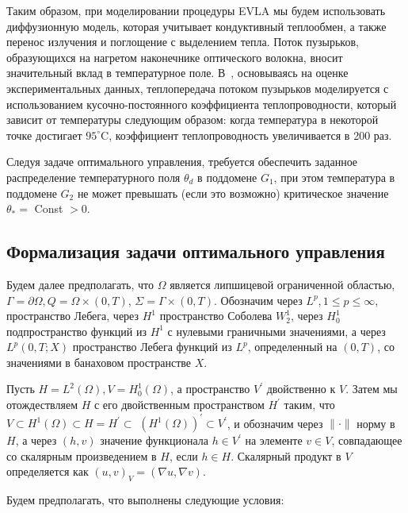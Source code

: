 Таким образом, при моделировании процедуры EVLA мы будем использовать
диффузионную модель, которая учитывает кондуктивный теплообмен,
а также перенос излучения и поглощение с выделением тепла.
Поток пузырьков, образующихся на нагретом наконечнике оптического волокна,
вносит значительный вклад в температурное поле.
В~\cite{Opticalthermal_vanRuijven2014, Some_Poluektova2014, Endovenous_Malskat2014},
основываясь на оценке экспериментальных данных,
теплопередача потоком пузырьков моделируется с использованием кусочно-постоянного
коэффициента теплопроводности, который зависит от температуры следующим образом:
когда температура в некоторой точке достигает $95 ^ {\circ} \mathrm{C}$,
коэффициент теплопроводность увеличивается в 200 раз.

Следуя задаче оптимального управления, требуется обеспечить заданное распределение
температурного поля $\theta_{d}$ в поддомене $G_{1}$, при этом температура в поддомене
$G_{2}$ не может превышать (если это возможно) критическое значение $\theta_{*}=$ Const $>0$.

\subsection{Формализация задачи оптимального управления}
\label{subsec:ch3:sec2:subsec2}

Будем далее предполагать, что $\Omega$ является липшицевой ограниченной областью,
$\Gamma=\partial \Omega, Q=\Omega \times(0, T)$, $\Sigma=\Gamma \times(0, T)$.
Обозначим через $L^{p}, 1 \leq p \leq \infty$, пространство Лебега,
через $H^{1}$ пространство Соболева $W_{2}^{1}$,
через $H_{ 0}^{1}$ подпространство функций из $H^{1}$ с нулевыми граничными значениями,
а через $L^{p}(0, T ; X)$ пространство Лебега функций из $L^{p}$,
определенный на $(0, T)$, со значениями в банаховом пространстве $X$.

Пусть $H=L^{2}(\Omega), V=H_{0}^{1}(\Omega)$, а пространство $V^{\prime}$ двойственно к $V$.
Затем мы отождествляем $H$ с его двойственным пространством $H^{\prime}$ таким,
что $V \subset H^{1}(\Omega) \subset H=H^{\prime} \subset$ $\left( H^{1}(\Omega)\right)^{\prime} \subset V^{\prime}$,
и обозначим через $\|\cdot\|$ норму в $H$, а через $(h , v)$
значение функционала $h \in V^{\prime}$ на элементе $v \in V$, совпадающее
со скалярным произведением в $H$, если $h \in H$.
Скалярный продукт в $V$ определяется как $(u, v)_{V}=(\nabla u, \nabla v)$.


Будем предполагать, что выполнены следующие условия:


